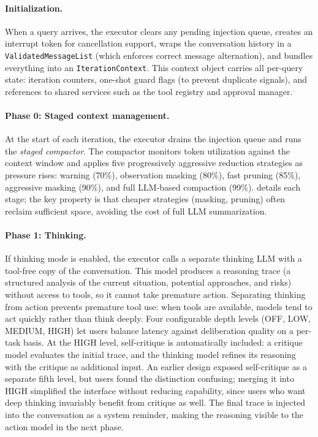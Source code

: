 \paragraph{Initialization.} When a query arrives, the executor clears any pending injection queue, creates an interrupt token for cancellation support, wraps the conversation history in a \texttt{ValidatedMessageList} (which enforces correct message alternation), and bundles everything into an \texttt{IterationContext}. This context object carries all per-query state: iteration counters, one-shot guard flags (to prevent duplicate signals), and references to shared services such as the tool registry and approval manager.

\paragraph{Phase 0: Staged context management.} At the start of each iteration, the executor drains the injection queue and runs the \emph{staged compactor}. The compactor monitors token utilization against the context window and applies five progressively aggressive reduction strategies as pressure rises: warning (70\%), observation masking (80\%), fast pruning (85\%), aggressive masking (90\%), and full LLM-based compaction (99\%).  details each stage; the key property is that cheaper strategies (masking, pruning) often reclaim sufficient space, avoiding the cost of full LLM summarization.

\paragraph{Phase 1: Thinking.} If thinking mode is enabled, the executor calls a separate thinking LLM with a tool-free copy of the conversation. This model produces a reasoning trace (a structured analysis of the current situation, potential approaches, and risks) without access to tools, so it cannot take premature action. Separating thinking from action prevents premature tool use: when tools are available, models tend to act quickly rather than think deeply. Four configurable depth levels (OFF, LOW, MEDIUM, HIGH) let users balance latency against deliberation quality on a per-task basis. At the HIGH level, self-critique is automatically included: a critique model evaluates the initial trace, and the thinking model refines its reasoning with the critique as additional input. An earlier design exposed self-critique as a separate fifth level, but users found the distinction confusing; merging it into HIGH simplified the interface without reducing capability, since users who want deep thinking invariably benefit from critique as well. The final trace is injected into the conversation as a system reminder, making the reasoning visible to the action model in the next phase.

